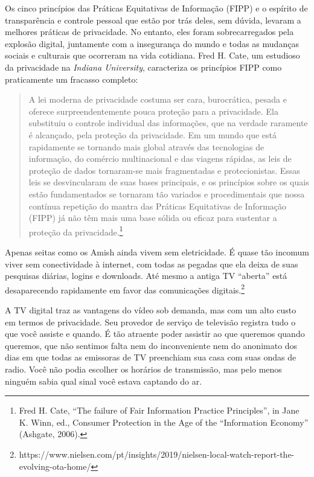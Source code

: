\documentclass{book}
\newcommand{\ingles}[1]{\textit{#1}}
\begin{document}
Os cinco princípios das Práticas Equitativas de Informação (FIPP) e o espírito
de transparência e controle pessoal que estão por trás deles, sem dúvida,
levaram a melhores práticas de privacidade. No entanto, eles foram
sobrecarregados pela explosão digital, juntamente com a insegurança do mundo e
todas as mudanças sociais e culturais que ocorreram na vida cotidiana. Fred H.
Cate, um estudioso da privacidade na \ingles{Indiana University}, caracteriza
os princípios FIPP como praticamente um fracasso completo:

\begin{quote}
    A lei moderna de privacidade costuma ser cara, burocrática, pesada e oferece
    surpreendentemente pouca proteção para a privacidade. Ela substituiu o controle
    individual das informações, que na verdade raramente é alcançado, pela proteção
    da privacidade. Em um mundo que está rapidamente se tornando mais global através
    das tecnologias de informação, do comércio multinacional e das viagens rápidas,
    as leis de proteção de dados tornaram-se mais fragmentadas e protecionistas.
    Essas leis se desvincularam de suas bases principais, e os princípios sobre os
    quais estão fundamentados se tornaram tão variados e procedimentais que nossa
    contínua repetição do mantra das Práticas Equitativas de Informação (FIPP) já
    não têm mais uma base sólida ou eficaz para sustentar a proteção da
    privacidade.\footnote{Fred H. Cate, ``The failure of Fair Information Practice
    Principles'', in Jane K. Winn, ed., Consumer Protection in the Age of the
    ``Information Economy'' (Ashgate, 2006).}
\end{quote}

Apenas seitas como os Amish ainda vivem sem eletricidade. É quase tão incomum
viver sem conectividade à internet, com todas as pegadas que ela deixa de suas
pesquisas diárias, logins e downloads. Até mesmo a antiga TV ``aberta'' está
desaparecendo rapidamente em favor das comunicações
digitais.\footnote{https://www.nielsen.com/pt/insights/2019/nielsen-local-watch-report-the-evolving-ota-home/}

A TV digital traz as vantagens do vídeo sob demanda, mas com um alto custo em
termos de privacidade. Seu provedor de serviço de televisão registra tudo o que
você assiste e quando. É tão atraente poder assistir ao que queremos quando
queremos, que não sentimos falta nem do inconveniente nem do anonimato dos dias
em que todas as emissoras de TV preenchiam sua casa com suas ondas de radio.
Você não podia escolher os horários de transmissão, mas pelo menos ninguém
sabia qual sinal você estava captando do ar.
\end{document}
